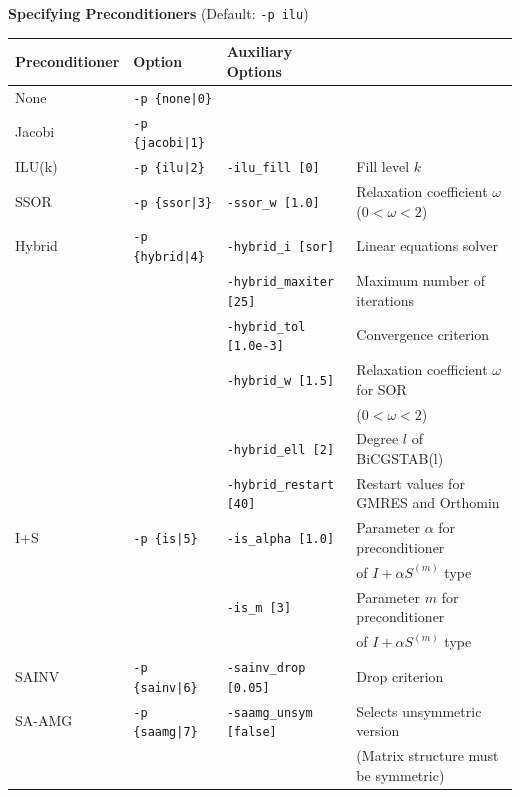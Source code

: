 \documentclass[a4paper]{article}
\begin{document}
\begin{minipage}[t]{\textwidth}
\begin{center}
{\bf Specifying Preconditioners} (Default: \verb=-p ilu=)\\
\begin{tabular}{l|lll}\hline\hline
Preconditioner   & Option           & Auxiliary Options \\ \hline
None     & \verb=-p {none|0}=    &   \\
Jacobi   & \verb=-p {jacobi|1}=  &     \\
ILU(k)   & \verb=-p {ilu|2}=     & \verb=-ilu_fill [0]=    & Fill level $k$ \\
SSOR     & \verb=-p {ssor|3}=    & \verb=-ssor_w [1.0]=    & Relaxation coefficient $\omega$ ($0<\omega<2$) \\
Hybrid   & \verb=-p {hybrid|4}=  & \verb=-hybrid_i [sor]=  & Linear
 equations solver \\
         &                       & \verb=-hybrid_maxiter [25]= & Maximum number of iterations \\
         &                       & \verb=-hybrid_tol [1.0e-3]= & Convergence criterion \\
         &                       & \verb=-hybrid_w [1.5]=      & Relaxation coefficient $\omega$ for SOR\\
         &                       &                             & ($0<\omega<2$) \\
         &                       & \verb=-hybrid_ell [2]=      & Degree $l$ of BiCGSTAB(l) \\
         &                       & \verb=-hybrid_restart [40]= & Restart values for GMRES and Orthomin \\
I+S      & \verb=-p {is|5}=      & \verb=-is_alpha [1.0]=  &  Parameter $\alpha$ for preconditioner \\
         &                       &                         &   of $I+\alpha S^{(m)}$ type \\
         &                       & \verb=-is_m [3]=        & Parameter $m$ for preconditioner \\
         &                       &                         &  of $I+\alpha S^{(m)}$ type \\
SAINV    & \verb=-p {sainv|6}=   & \verb=-sainv_drop [0.05]=    & Drop criterion\\
SA-AMG   & \verb=-p {saamg|7}=   & \verb=-saamg_unsym [false]=    &
 Selects unsymmetric version    \\
         &                       &                             & (Matrix structure must be symmetric)    \\

\end{tabular}
\end{center}
\end{minipage}
\end{document}
